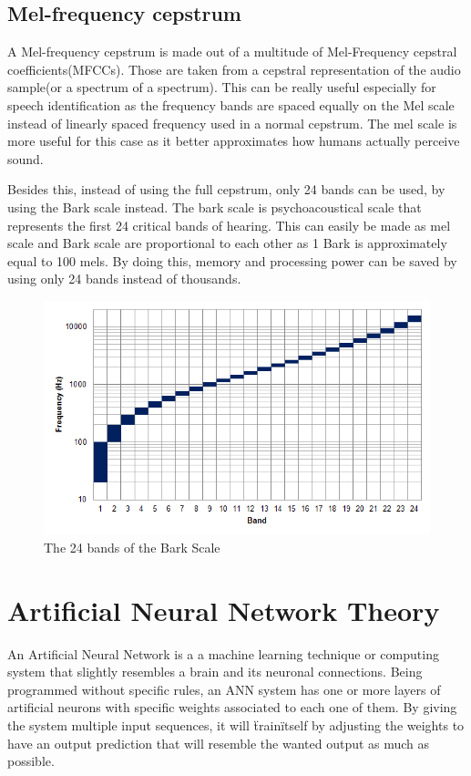 
\subsection{Mel-frequency cepstrum}
A Mel-frequency cepstrum is made out of a multitude of Mel-Frequency cepstral coefficients(MFCCs). Those are taken from a cepstral representation of the audio sample(or a spectrum of a spectrum).
This can be really useful especially for speech identification as the frequency bands are spaced equally on the Mel scale instead of linearly spaced frequency used in a normal cepstrum. The mel scale is more useful for this case as it better approximates how humans actually perceive sound.


Besides this, instead of using the full cepstrum, only 24 bands can be used, by using the Bark scale instead.
The bark scale is psychoacoustical scale that represents the first 24 critical bands of hearing. This can easily be made as mel scale and Bark scale are proportional to each other as 1 Bark is approximately equal to 100 mels.
By doing this, memory and processing power can be saved by using only 24 bands instead of thousands.
\begin{figure}[htp]
	\centering
	\includegraphics[width=1\textwidth]{Illustrations/Bark_scale.png}
	\caption{The 24 bands of the Bark Scale}
	\label{fig:BarkScale}
\end{figure}
\newpage
\section{Artificial Neural Network Theory}

An Artificial Neural Network is a a machine learning technique or computing system that slightly resembles a brain and its neuronal connections. Being programmed without specific rules, an ANN system has one or more layers of artificial neurons with specific weights associated to each one of them. By giving the system multiple input sequences, it will \"train\" itself by adjusting the weights to have an output prediction that will resemble the wanted output as much as possible.

